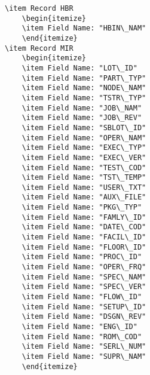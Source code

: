 \documentclass[letterpaper]{article}
\begin{document}
\begin{verbatim}
\item Record HBR
    \begin{itemize}
    \item Field Name: "HBIN\_NAM"
    \end{itemize}
\item Record MIR
    \begin{itemize}
    \item Field Name: "LOT\_ID"
    \item Field Name: "PART\_TYP"
    \item Field Name: "NODE\_NAM"
    \item Field Name: "TSTR\_TYP"
    \item Field Name: "JOB\_NAM"
    \item Field Name: "JOB\_REV"
    \item Field Name: "SBLOT\_ID"
    \item Field Name: "OPER\_NAM"
    \item Field Name: "EXEC\_TYP"
    \item Field Name: "EXEC\_VER"
    \item Field Name: "TEST\_COD"
    \item Field Name: "TST\_TEMP"
    \item Field Name: "USER\_TXT"
    \item Field Name: "AUX\_FILE"
    \item Field Name: "PKG\_TYP"
    \item Field Name: "FAMLY\_ID"
    \item Field Name: "DATE\_COD"
    \item Field Name: "FACIL\_ID"
    \item Field Name: "FLOOR\_ID"
    \item Field Name: "PROC\_ID"
    \item Field Name: "OPER\_FRQ"
    \item Field Name: "SPEC\_NAM"
    \item Field Name: "SPEC\_VER"
    \item Field Name: "FLOW\_ID"
    \item Field Name: "SETUP\_ID"
    \item Field Name: "DSGN\_REV"
    \item Field Name: "ENG\_ID"
    \item Field Name: "ROM\_COD"
    \item Field Name: "SERL\_NUM"
    \item Field Name: "SUPR\_NAM"
    \end{itemize}

\end{verbatim}
\end{document}
